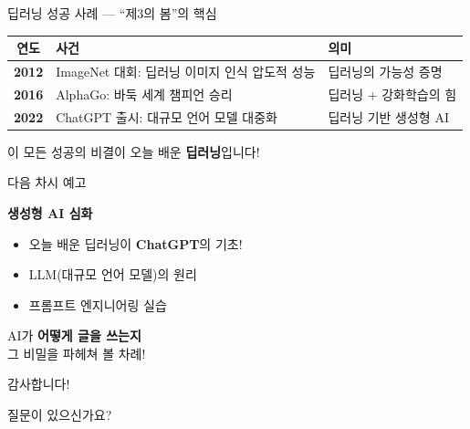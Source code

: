 \documentclass[aspectratio=169]{beamer}
\begin{document}
\begin{frame}{딥러닝 성공 사례 — ``제3의 봄''의 핵심}
\begin{center}
\begin{tabular}{|c|p{5cm}|p{4cm}|}
\hline
\rowcolor{tableheader}
\textbf{연도} & \textbf{사건} & \textbf{의미} \\
\hline
\textbf{2012} & ImageNet 대회: 딥러닝 이미지 인식 압도적 성능 & 딥러닝의 가능성 증명 \\
\hline
\textbf{2016} & AlphaGo: 바둑 세계 챔피언 승리 & 딥러닝 + 강화학습의 힘 \\
\hline
\textbf{2022} & ChatGPT 출시: 대규모 언어 모델 대중화 & 딥러닝 기반 생성형 AI \\
\hline
\end{tabular}
\end{center}
\vspace{0.5cm}
\begin{center}
\large 이 모든 성공의 비결이 오늘 배운 \textbf{딥러닝}입니다!
\end{center}
\end{frame}

\begin{frame}{다음 차시 예고}
\begin{center}
\Large \textbf{생성형 AI 심화}
\end{center}
\vspace{0.5cm}
\begin{itemize}
    \item 오늘 배운 딥러닝이 \textbf{ChatGPT}의 기초!
    \item LLM(대규모 언어 모델)의 원리
    \item 프롬프트 엔지니어링 실습
\end{itemize}
\vspace{0.5cm}
\begin{center}
AI가 \textbf{어떻게 글을 쓰는지}\\그 비밀을 파헤쳐 볼 차례! 
\end{center}
\end{frame}

\begin{frame}[standout]
 감사합니다!

\vspace{0.5cm}
질문이 있으신가요?
\end{frame}
\end{document}
